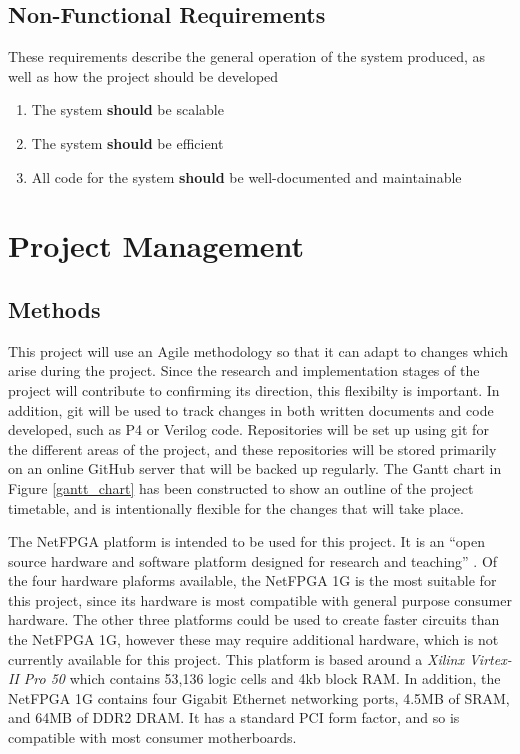 \documentclass[12pt, a4paper, twoside, onecolumn]{article}
\begin{document}
\subsection{Non-Functional Requirements}
\label{non_functional_requirements}
These requirements describe the general operation of the system produced, as well as how the project should be developed

\begin{enumerate}[label=\textbf{NF\arabic*:}]
  \item The system \textbf{should} be scalable
  \item The system \textbf{should} be efficient
  \item All code for the system \textbf{should} be well-documented and maintainable
\end{enumerate}
\newpage

\section{Project Management}
\label{project_management}

\subsection{Methods}
\label{methods}
This project will use an Agile methodology so that it can adapt to changes which arise during the project. Since the research and implementation stages of the project will contribute to confirming its direction, this flexibilty is important. In addition, git \cite{git} will be used to track changes in both written documents and code developed, such as P4 or Verilog code. Repositories will be set up using git for the different areas of the project, and these repositories will be stored primarily on an online GitHub \cite{github} server that will be backed up regularly. The Gantt chart in Figure \ref{gantt_chart} has been constructed to show an outline of the project timetable, and is intentionally flexible for the changes that will take place.

The NetFPGA \cite{NetFPGA} platform is intended to be used for this project. It is an ``open source hardware and software platform designed for research and teaching'' \cite{NetFPGA_about}. Of the four hardware plaforms available, the NetFPGA 1G \cite{NetFPGA_1G} is the most suitable for this project, since its hardware is most compatible with general purpose consumer hardware. The other three platforms could be used to create faster circuits than the NetFPGA 1G, however these may require additional hardware, which is not currently available for this project. This platform is based around a \textit{Xilinx Virtex-II Pro 50} \cite{virtex2-pro} which contains 53,136 logic cells and 4kb block RAM. In addition, the NetFPGA 1G contains four Gigabit Ethernet networking ports, 4.5MB of SRAM, and 64MB of DDR2 DRAM. It has a standard PCI form factor, and so is compatible with most consumer motherboards.
\end{document}

